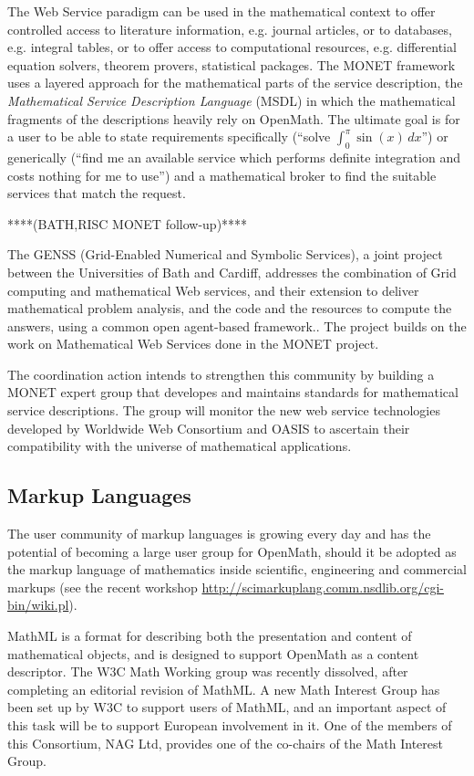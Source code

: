 \documentclass[draft]{artikel3}
\begin{document}
The Web Service paradigm can be used in the mathematical context to
offer controlled access to literature information, e.g. journal
articles, or to databases, e.g.  integral tables, or to offer access
to computational resources, e.g.  differential equation solvers,
theorem provers, statistical packages.  The MONET framework uses a
layered approach for the mathematical parts of the service
description, the \emph{Mathematical Service Description Language}
(MSDL) in which the mathematical fragments of the descriptions heavily
rely on OpenMath.  The ultimate goal is for a user to be able to state
requirements specifically (``solve $\int_0^\pi{}\sin(x)\,dx$'') or
generically (``find me an available service which performs definite
integration and costs nothing for me to use'') and a mathematical
broker to find the suitable services that match the request.

****(BATH,RISC MONET follow-up)**** 

The GENSS (Grid-Enabled Numerical and Symbolic Services), a joint
project between the Universities of Bath and Cardiff, addresses the
combination of Grid computing and mathematical Web services, and their
extension to deliver mathematical problem analysis, and the code and
the resources to compute the answers, using a common open agent-based
framework.. The project builds on the work on Mathematical Web
Services done in the MONET project.

The coordination action intends to strengthen this community by
building a MONET expert group that developes and maintains standards
for mathematical service descriptions. The group will monitor the new
web service technologies developed by Worldwide Web Consortium and
OASIS to ascertain their compatibility with the universe of
mathematical applications. 

\subsection{Markup Languages}
\label{sec:ml}

The user community of markup languages is growing every day and has
the potential of becoming a large user group for OpenMath, should it
be adopted as the markup language of mathematics inside scientific,
engineering and commercial markups (see the recent workshop
\url{http://scimarkuplang.comm.nsdlib.org/cgi-bin/wiki.pl}).

MathML is a format for describing both the presentation and content of
mathematical objects, and is designed to support OpenMath as a content
descriptor.  The W3C Math Working group was recently dissolved, after
completing an editorial revision of MathML.  A new Math Interest Group
has been set up by W3C to support users of MathML, and an important
aspect of this task will be to support European involvement in it.
One of the members of this Consortium, NAG Ltd, provides one of the
co-chairs of the Math Interest Group.
\end{document}
